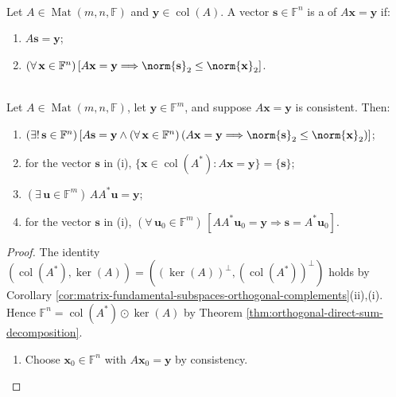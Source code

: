 \begin{definition} \label{def:minimum-norm-solution} \\
Let $A\in\operatorname{Mat}(m,n,\mathbb{F})$ and $\mathbf{y}\in\operatorname{col}(A)$. A vector $\mathbf{s}\in\mathbb{F}^n$ is a  of $A\mathbf{x}=\mathbf{y}$ if:
\begin{enumerate}[label=(\roman*)]
\setlength{\itemsep}{0pt}
\item $A\mathbf{s}=\mathbf{y}$;
\item $(\forall\,\mathbf{x}\in\mathbb{F}^n)\,[A\mathbf{x}=\mathbf{y}\Longrightarrow\norm{\mathbf{s}}_2\leq\norm{\mathbf{x}}_2]$.
\end{enumerate}
\end{definition}

\begin{theorem} \label{thm:minimum-norm-solution-consistent-system} \\
Let $A\in\operatorname{Mat}(m,n,\mathbb{F})$, let $\mathbf{y}\in\mathbb{F}^m$, and suppose $A\mathbf{x}=\mathbf{y}$ is consistent. Then:
\begin{enumerate}[label=(\roman*)]
\setlength{\itemsep}{0pt}
\item $(\exists!\,\mathbf{s}\in\mathbb{F}^n)\,[A\mathbf{s}=\mathbf{y}\land(\forall\,\mathbf{x}\in\mathbb{F}^n)\,(A\mathbf{x}=\mathbf{y}\Longrightarrow\norm{\mathbf{s}}_2\leq\norm{\mathbf{x}}_2)]$;
\item for the vector $\mathbf{s}$ in (i), $\{\mathbf{x}\in\operatorname{col}(A^*):A\mathbf{x}=\mathbf{y}\}=\{\mathbf{s}\}$;
\item $(\exists\,\mathbf{u}\in\mathbb{F}^m)\,AA^*\mathbf{u}=\mathbf{y}$;
\item for the vector $\mathbf{s}$ in (i), $(\forall\,\mathbf{u}_0\in\mathbb{F}^m)\,[AA^*\mathbf{u}_0=\mathbf{y}\Longrightarrow\mathbf{s}=A^*\mathbf{u}_0]$.
\end{enumerate}
\begin{proof}
The identity $(\operatorname{col}(A^*),\ker(A))=((\ker(A))^{\perp},(\operatorname{col}(A^*))^{\perp})$ holds by Corollary \ref{cor:matrix-fundamental-subspaces-orthogonal-complements}(ii),(i).\\
Hence $\mathbb{F}^n=\operatorname{col}(A^*)\odot\ker(A)$ by Theorem \ref{thm:orthogonal-direct-sum-decomposition}.
\begin{enumerate}[label=(\roman*)]
\setlength{\itemsep}{0pt}
\item Choose $\mathbf{x}_0\in\mathbb{F}^n$ with $A\mathbf{x}_0=\mathbf{y}$ by consistency.\\

\end{enumerate}
\end{proof}
\end{theorem}

